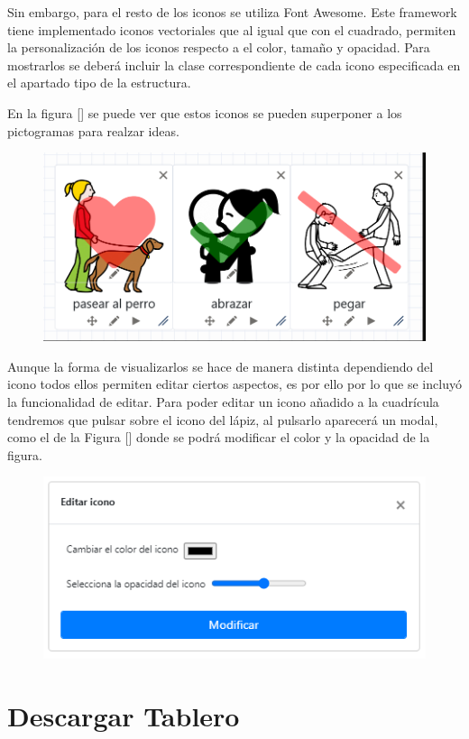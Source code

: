 Sin embargo, para el resto de los iconos se utiliza Font Awesome. Este framework tiene implementado iconos vectoriales que al igual que con el cuadrado, permiten la personalización de los iconos respecto a el color, tamaño y opacidad. Para mostrarlos se deberá incluir la clase correspondiente de cada icono especificada en el apartado tipo de la estructura.

En la figura [] se puede ver que estos iconos se pueden superponer a los pictogramas para realzar ideas.

\begin{figure}[h!]
	\centering
	\includegraphics[width=0.7\linewidth]{Imagenes/Bitmap/ejemploPictoItem}
	\caption{}
	\label{fig:ejemplopictoitem}
\end{figure}

 
Aunque la forma de visualizarlos se hace de manera distinta dependiendo del icono todos ellos permiten editar ciertos aspectos, es por ello por lo que se incluyó la funcionalidad de editar. Para poder editar un icono añadido a la cuadrícula tendremos que pulsar sobre el icono del lápiz, al pulsarlo aparecerá un modal, como el de la Figura [] donde se podrá modificar el color y la opacidad de la figura.  

\begin{figure}[h!]
	\centering
	\includegraphics[width=0.7\linewidth]{Imagenes/Bitmap/modalPictoItem}
	\caption{}
	\label{fig:modalpictoitem}
\end{figure}


\section{Descargar Tablero}



